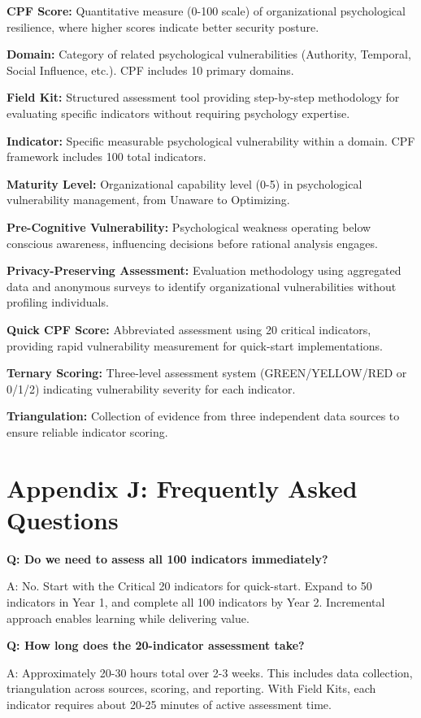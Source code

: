 \documentclass[11pt,a4paper]{article}
\begin{document}
\textbf{CPF Score:} Quantitative measure (0-100 scale) of organizational psychological resilience, where higher scores indicate better security posture.

\textbf{Domain:} Category of related psychological vulnerabilities (Authority, Temporal, Social Influence, etc.). CPF includes 10 primary domains.

\textbf{Field Kit:} Structured assessment tool providing step-by-step methodology for evaluating specific indicators without requiring psychology expertise.

\textbf{Indicator:} Specific measurable psychological vulnerability within a domain. CPF framework includes 100 total indicators.

\textbf{Maturity Level:} Organizational capability level (0-5) in psychological vulnerability management, from Unaware to Optimizing.

\textbf{Pre-Cognitive Vulnerability:} Psychological weakness operating below conscious awareness, influencing decisions before rational analysis engages.

\textbf{Privacy-Preserving Assessment:} Evaluation methodology using aggregated data and anonymous surveys to identify organizational vulnerabilities without profiling individuals.

\textbf{Quick CPF Score:} Abbreviated assessment using 20 critical indicators, providing rapid vulnerability measurement for quick-start implementations.

\textbf{Ternary Scoring:} Three-level assessment system (GREEN/YELLOW/RED or 0/1/2) indicating vulnerability severity for each indicator.

\textbf{Triangulation:} Collection of evidence from three independent data sources to ensure reliable indicator scoring.

\section{Appendix J: Frequently Asked Questions}

\textbf{Q: Do we need to assess all 100 indicators immediately?}

A: No. Start with the Critical 20 indicators for quick-start. Expand to 50 indicators in Year 1, and complete all 100 indicators by Year 2. Incremental approach enables learning while delivering value.

\textbf{Q: How long does the 20-indicator assessment take?}

A: Approximately 20-30 hours total over 2-3 weeks. This includes data collection, triangulation across sources, scoring, and reporting. With Field Kits, each indicator requires about 20-25 minutes of active assessment time.
\end{document}
